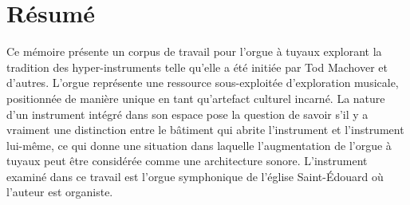 \documentclass[12pt,twoside,maitrise]{dms_ks}
\theoremstyle{definition}
\begin{document}

\maketitle

\maketitle


\francais

\chapter*{Résumé}

Ce mémoire présente un corpus de travail pour l'orgue à tuyaux explorant la tradition des hyper-instruments telle qu'elle a été initiée par Tod Machover et d'autres. 
L'orgue représente une ressource sous-exploitée d'exploration musicale, positionnée de manière unique en tant qu'artefact culturel incarné. 
La nature d'un instrument intégré dans son espace pose la question de savoir s'il y a vraiment une distinction entre le bâtiment qui abrite l'instrument et l'instrument lui-même, ce qui donne une situation dans laquelle l'augmentation de l'orgue à tuyaux peut être considérée comme une architecture sonore. 
L'instrument examiné dans ce travail est l'orgue symphonique de l’église Saint-Édouard où l'auteur est organiste. 
\end{document}
